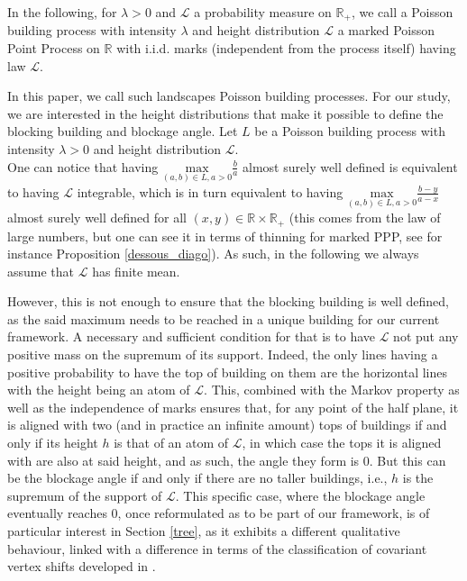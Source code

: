 \documentclass[10pt,english,a4paper]{smfart}
\theoremstyle{definition}
\theoremstyle{remark}
\newcommand{\R}{\mathbb{R}}
\newcommand{\Half}{\R \times \R_+}
\begin{document}
In the following, for $\lambda > 0$ and $\mathcal{L}$ a probability measure on $\R_+$, we call a Poisson building process with intensity $\lambda$ and height distribution $\mathcal{L}$ a marked Poisson Point Process on $\R$ with i.i.d. marks (independent from the process itself) having law $\mathcal{L}$.

In this paper, we call such landscapes Poisson building processes. For our study, we are interested in the height distributions that make it possible to define the blocking building and blockage angle. Let $L$ be a Poisson building process with intensity $\lambda >0$ and height distribution $\mathcal{L}$.\\

One can notice that having $\underset{(a, b) \in L, a>0}{\text{max}} \frac{b}{a}$ almost surely well defined is equivalent to having $\mathcal{L}$ integrable, which is in turn equivalent to having $\underset{(a, b) \in L, a>0}{\text{max}} \frac{b-y}{a-x}$ almost surely well defined for all $(x, y)\in \Half$ (this comes from the law of large numbers, but one can see it in terms of thinning for marked PPP, see for instance Proposition \ref{dessous_diago}). As such, in the following we always assume that $\mathcal{L}$ has finite mean.

However, this is not enough to ensure that the blocking building is well defined, as the said maximum needs to be reached in a unique building for our current framework. A necessary and sufficient condition for that is to have $\mathcal{L}$ not put any positive mass on the supremum of its support. Indeed, the only lines having a positive probability to have the top of building on them are the horizontal lines with the height being an atom of $\mathcal{L}$. This, combined with the Markov property as well as the independence of marks ensures that, for any point of the half plane, it is aligned with two (and in practice an infinite amount) tops of buildings if and only if its height $h$ is that of an atom of $\mathcal{L}$, in which case the tops it is aligned with are also at said height, and as such, the angle they form is $0$. But this can be the blockage angle if and only if there are no taller buildings, i.e., $h$ is the supremum of the support of $\mathcal{L}$. This specific case, where the blockage angle eventually reaches $0$, once reformulated as to be part of our framework, is of particular interest in Section \ref{tree}, as it exhibits a different qualitative behaviour, linked with a difference in terms of the classification of covariant vertex shifts developed in \cite{EFT}.\\
\end{document}
